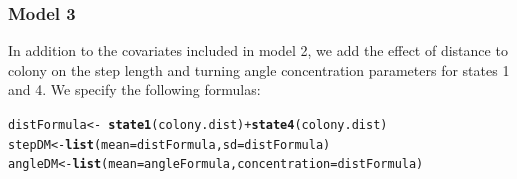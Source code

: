 \documentclass[12pt]{article}\usepackage[]{graphicx}\usepackage[]{xcolor}
\makeatletter
\newcommand{\hlopt}[1]{\textcolor[rgb]{0,0,0}{#1}}%
\newcommand{\hldef}[1]{\textcolor[rgb]{0.345,0.345,0.345}{#1}}%
\newcommand{\hlkwb}[1]{\textcolor[rgb]{0.69,0.353,0.396}{#1}}%
\newcommand{\hlkwc}[1]{\textcolor[rgb]{0.333,0.667,0.333}{#1}}%
\newcommand{\hlkwd}[1]{\textcolor[rgb]{0.737,0.353,0.396}{\textbf{#1}}}%
\newenvironment{kframe}{%
 \def\at@end@of@kframe{}%
 \ifinner\ifhmode%
  \def\at@end@of@kframe{\end{minipage}}%
  \begin{minipage}{\columnwidth}%
 \fi\fi%
 \def\FrameCommand##1{\hskip\@totalleftmargin \hskip-\fboxsep
 \colorbox{shadecolor}{##1}\hskip-\fboxsep
     \hskip-\linewidth \hskip-\@totalleftmargin \hskip\columnwidth}%
 \MakeFramed {\advance\hsize-\width
   \@totalleftmargin\z@ \linewidth\hsize
   \@setminipage}}%
 {\par\unskip\endMakeFramed%
 \at@end@of@kframe}
\newenvironment{knitrout}{}{} %
\makeatother
\begin{document}
\subsubsection{Model 3}
In addition to the covariates included in model 2, we add the effect of distance to colony on the step length and turning angle concentration parameters for states 1 and 4. We specify the following formulas:
\begin{knitrout}
\color{fgcolor}\begin{kframe}
\begin{alltt}
\hldef{distFormula} \hlkwb{<-} \hlopt{~} \hlkwd{state1}\hldef{(colony.dist)} \hlopt{+} \hlkwd{state4}\hldef{(colony.dist)}
\hldef{stepDM} \hlkwb{<-} \hlkwd{list}\hldef{(}\hlkwc{mean}\hldef{=distFormula,} \hlkwc{sd}\hldef{=distFormula)}
\hldef{angleDM} \hlkwb{<-} \hlkwd{list}\hldef{(}\hlkwc{mean}\hldef{=angleFormula,} \hlkwc{concentration}\hldef{=distFormula)}
\end{alltt}
\end{kframe}
\end{knitrout}
\end{document}
